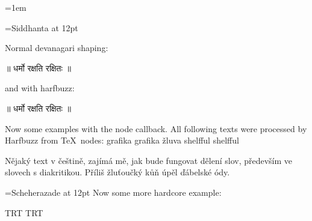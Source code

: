 \documentclass{article}
\begin{document}
\parindent=0pt
\parskip=1em
%  

\frenchspacing %

\font\siddhanta={Siddhanta} at 12pt
\bigskip

\siddhanta 

Normal devanagari shaping: 

॥ धर्मो रक्षति रक्षितः ॥

\startharfbuzz

and with harfbuzz: 


॥ धर्मो रक्षति रक्षितः ॥

\ahoj


Now some examples with the node callback. All following texts were processed by
Harfbuzz from TeX\ nodes: grafika graf\/ika žluva shelfful shelf\/ful


Nějaký text v češtině, zajímá mě, jak bude fungovat dělení slov, především ve
slovech s diakritikou. Příliš žluťoučký kůň úpěl ďábelské ódy. 


\font\amiri={Scheherazade} at 12pt
\amiri
Now some more hardcore example:

\bgroup
\textdir TRT
\pardir TRT
\end{document}
